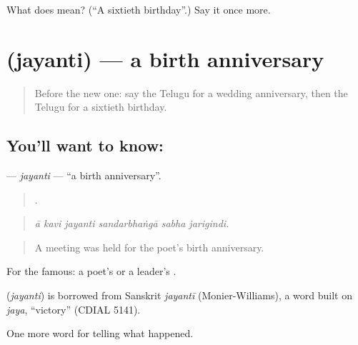 \begin{tcolorbox}[breakable,colback=teal!4,colframe=teal!35!black,title={Before you move on}]
What does  mean? (\textquotedblleft{}A sixtieth birthday\textquotedblright{}.) Say it once more.
\end{tcolorbox}
\section[\texorpdfstring{\te{జయంతి} (jayanti)}{జయంతి (jayanti)}]{ (jayanti) — a birth anniversary}

\label{lesson:TE-C355-jayanti}



\begin{quote}
Before the new one: say the Telugu for a wedding anniversary, then the Telugu for a sixtieth birthday.
\end{quote}

\subsection*{You'll want to know: }
\textbf{} — \emph{jayanti} — \textquotedblleft{}a birth anniversary\textquotedblright{}.

\begin{quote}
     .
\end{quote}

\begin{quote}
\emph{ā kavi jayanti sandarbhaṅgā sabha jarigindi.}
\end{quote}

\begin{quote}
A meeting was held for the poet's birth anniversary.
\end{quote}

For the famous: a poet's or a leader's .

\begin{cousinweb}
\textbf{} (\emph{jayanti}) is borrowed from Sanskrit \emph{jayantī} (Monier-Williams), a word built on \emph{jaya}, \textquotedblleft{}victory\textquotedblright{} (CDIAL 5141).
\end{cousinweb}

\begin{grammarlens}[title={What you've built}]
One more word for telling what happened.
\end{grammarlens}


